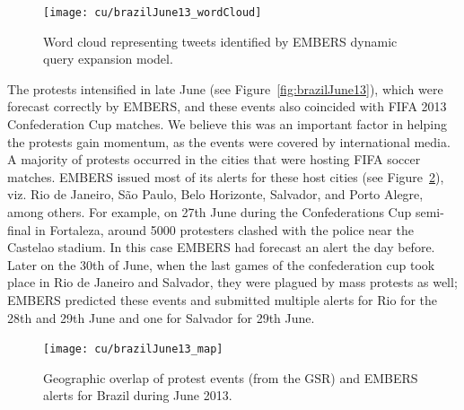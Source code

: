 \begin{figure} %
\centering
\texttt{[image: cu/brazilJune13\_wordCloud]}
\caption{Word cloud representing tweets identified by EMBERS dynamic query expansion model.}
\label{fig:brazilJune13_wordCloud}
\end{figure}

The protests intensified in late June (see Figure~\ref{fig:brazilJune13}), which were
forecast correctly by EMBERS, and these events
also coincided with FIFA 2013 Confederation Cup matches. We believe this was an important factor in helping
the protests gain momentum,
as the events were covered by international media. A majority of protests
occurred in the cities that were hosting FIFA soccer matches.
EMBERS issued most of its alerts for these host cities (see
Figure~\ref{fig:brazilJune13_map}), viz.
Rio de Janeiro, São Paulo,
Belo Horizonte, Salvador, and Porto Alegre,
among others. For example, on 27th June during the Confederations Cup
semi-final in Fortaleza, around 5000 protesters clashed with the police
near the Castelao stadium. In this case EMBERS had forecast an alert the
day before. Later on the 30th of June, when the last games of the
confederation cup took place in Rio de Janeiro and Salvador, they
were plagued by mass protests as well; EMBERS predicted these events and
submitted multiple alerts for Rio for the 28th and 29th June and one for
Salvador for 29th June.

\begin{figure} %
\centering
\texttt{[image: cu/brazilJune13\_map]}
\caption{Geographic overlap of protest events (from the GSR) and EMBERS
alerts for Brazil during June 2013.}
\label{fig:brazilJune13_map}
\end{figure}

